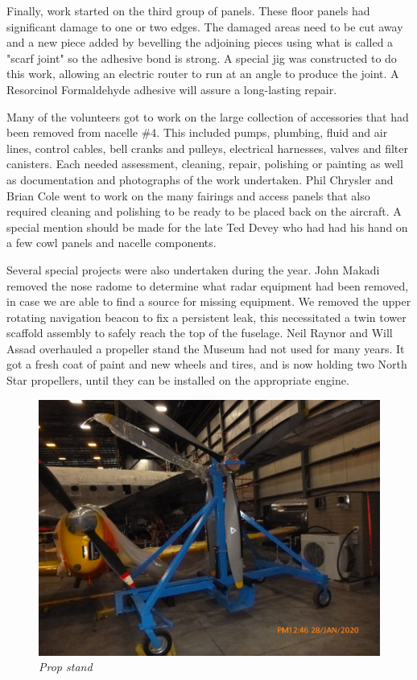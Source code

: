Finally, work started on the third group of panels.  These floor panels
had significant damage to one or two edges.  The damaged areas need to
be cut away and a new piece added by bevelling the adjoining pieces
using what is called a "scarf joint" so the adhesive bond is strong.  A
special jig was constructed to do this work, allowing an electric
router to run at an angle to produce the joint. A Resorcinol
Formaldehyde adhesive will assure a long-lasting repair.

Many of the volunteers got to work on the large collection of
accessories that had been removed from nacelle \#4.  This included
pumps, plumbing, fluid and air lines, control cables, bell cranks and
pulleys, electrical harnesses, valves and filter canisters. Each needed
assessment, cleaning, repair, polishing or painting as well as
documentation and photographs of the work undertaken. Phil Chrysler and 
Brian Cole went to work on the many fairings and
access panels that also required cleaning and polishing to be ready to
be placed back on the aircraft. A special mention should be made for the late
Ted Devey who had had his hand on a few cowl panels and nacelle components.

Several special projects were also undertaken during the year.  John
Makadi removed the nose radome to determine what radar equipment had
been removed, in case we are able to find a source for missing
equipment.  We removed the upper rotating navigation beacon to fix a
persistent leak, this necessitated a twin tower scaffold assembly to
safely reach the top of the fuselage. Neil Raynor and Will Assad
overhauled a propeller stand the Museum had not used for many years. 
It got a fresh coat of paint and new wheels and tires, and is now
holding two North Star propellers, until they can be installed on the
appropriate engine. 

\begin{figure}[httb]
   \vspace{2em}
   \centering
   \includegraphics [scale=0.5]{prop-stand.png}
   \caption*{\small \em Prop stand}
   \label{fig:wall-two}
\end{figure}

